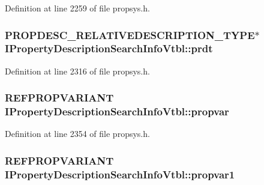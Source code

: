 Definition at line 2259 of file propsys.\+h.

\subsubsection[{\texorpdfstring{prdt}{prdt}}]{ {\bf P\+R\+O\+P\+D\+E\+S\+C\+\_\+\+R\+E\+L\+A\+T\+I\+V\+E\+D\+E\+S\+C\+R\+I\+P\+T\+I\+O\+N\+\_\+\+T\+Y\+PE}$\ast$ I\+Property\+Description\+Search\+Info\+Vtbl\+::prdt}\hypertarget{struct_i_property_description_search_info_vtbl_aad683991b88efe5d21f3040413b6b9b5}{}\label{struct_i_property_description_search_info_vtbl_aad683991b88efe5d21f3040413b6b9b5}


Definition at line 2316 of file propsys.\+h.

\subsubsection[{\texorpdfstring{propvar}{propvar}}]{ {\bf R\+E\+F\+P\+R\+O\+P\+V\+A\+R\+I\+A\+NT} I\+Property\+Description\+Search\+Info\+Vtbl\+::propvar}\hypertarget{struct_i_property_description_search_info_vtbl_a175b16b21894c44e75c3caaa500cd7d4}{}\label{struct_i_property_description_search_info_vtbl_a175b16b21894c44e75c3caaa500cd7d4}


Definition at line 2354 of file propsys.\+h.

\subsubsection[{\texorpdfstring{propvar1}{propvar1}}]{ {\bf R\+E\+F\+P\+R\+O\+P\+V\+A\+R\+I\+A\+NT} I\+Property\+Description\+Search\+Info\+Vtbl\+::propvar1}\hypertarget{struct_i_property_description_search_info_vtbl_ad892339bbc71d4940024525d6bb088fb}{}\label{struct_i_property_description_search_info_vtbl_ad892339bbc71d4940024525d6bb088fb}


